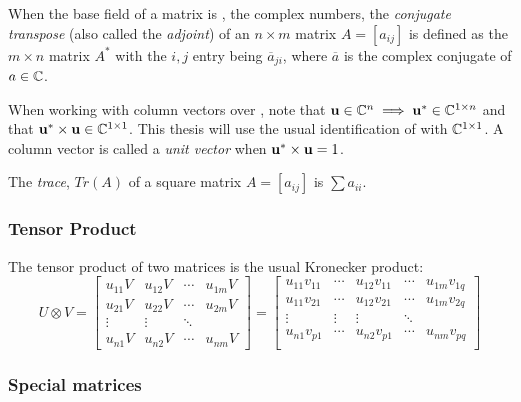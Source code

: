 When the base field of a matrix is \complex, the complex numbers, the \emph{conjugate transpose}
(also called the \emph{adjoint}) of an $n\times m$ matrix $A=[a_{ij}]$ is defined as the $m\times
n$ matrix $A^{*}$ with the $i,j$ entry being $\overline{a}_{ji}$, where $\overline{a}$ is the
complex conjugate of $a\in\mathbb{C}$.

When working with column vectors over \complex, note that $\mathbf{u} \in \mathbb{C}^n \implies
\mathbf{u}^{*} \in \mathbb{C}^{1\times n}$ and that $\mathbf{u}^{*}\times \mathbf{u} \in \mathbb{C}^{1\times 1}$.
This thesis will use the usual identification of \complex{} with $\mathbb{C}^{1\times1}$. A column
vector  is called a \emph{unit vector} when $\mathbf{u}^{*}\times \mathbf{u} = 1$.

\begin{definition}[Trace]
  The \emph{trace}, $Tr(A)$ of a square matrix $A=[a_{ij}]$ is $\sum a_{ii}$.
\end{definition}

\subsubsection{Tensor Product} %
\label{ssub:tensor_product}


The tensor product of two matrices is the usual Kronecker product:
  \[
    U\otimes V =
    \begin{bmatrix}
      u_{11}V&u_{12}V & \cdots &u_{1m}V\\
      u_{21}V&u_{22}V & \cdots &u_{2m}V \\
      \vdots&\vdots&\ddots\\
      u_{n1}V&u_{n2}V & \cdots &u_{nm}V
    \end{bmatrix}
    =
    \begin{bmatrix}
      u_{11}v_{11}&\cdots&u_{12}v_{11} & \cdots& u_{1m}v_{1q} \\
      u_{11}v_{21}&\cdots&u_{12}v_{21} & \cdots& u_{1m}v_{2q} \\
      \vdots&\vdots&\vdots&\ddots \\
      u_{n1}v_{p1}&\cdots&u_{n2}v_{p1} & \cdots& u_{nm}v_{pq} \\
    \end{bmatrix}
  \]

\subsubsection{Special matrices} %
\label{ssub:special_matrices}

